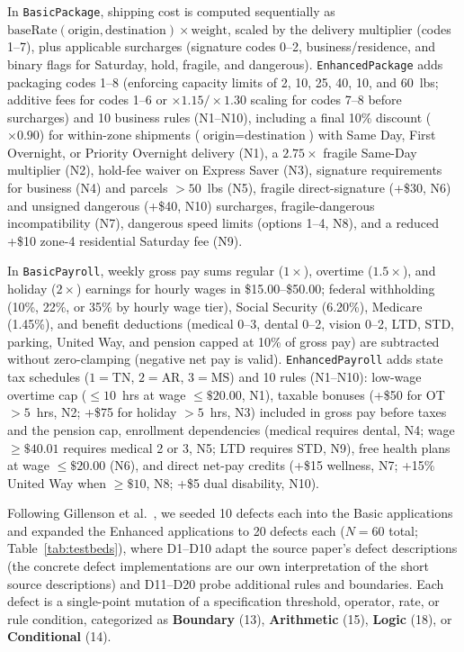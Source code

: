 \documentclass[acmsmall]{acmart}
\begin{document}
In \texttt{BasicPackage}, shipping cost is computed sequentially as $\text{baseRate}(\text{origin}, \text{destination}) \times \text{weight}$, scaled by the delivery multiplier (codes 1--7), plus applicable surcharges (signature codes 0--2, business/residence, and binary flags for Saturday, hold, fragile, and dangerous). \texttt{EnhancedPackage} adds packaging codes 1--8 (enforcing capacity limits of 2, 10, 25, 40, 10, and 60~lbs; additive fees for codes 1--6 or $\times 1.15/\times 1.30$ scaling for codes 7--8 before surcharges) and 10 business rules (N1--N10), including a final 10\% discount ($\times 0.90$) for within-zone shipments ($\text{origin}=\text{destination}$) with Same Day, First Overnight, or Priority Overnight delivery (N1), a $2.75\times$ fragile Same-Day multiplier (N2), hold-fee waiver on Express Saver (N3), signature requirements for business (N4) and parcels $>50$~lbs (N5), fragile direct-signature (+\$30, N6) and unsigned dangerous (+\$40, N10) surcharges, fragile-dangerous incompatibility (N7), dangerous speed limits (options 1--4, N8), and a reduced +\$10 zone-4 residential Saturday fee (N9).

In \texttt{BasicPayroll}, weekly gross pay sums regular ($1\times$), overtime ($1.5\times$), and holiday ($2\times$) earnings for hourly wages in \$15.00--\$50.00; federal withholding (10\%, 22\%, or 35\% by hourly wage tier), Social Security (6.20\%), Medicare (1.45\%), and benefit deductions (medical 0--3, dental 0--2, vision 0--2, LTD, STD, parking, United Way, and pension capped at 10\% of gross pay) are subtracted without zero-clamping (negative net pay is valid). \texttt{EnhancedPayroll} adds state tax schedules ($1=\text{TN}$, $2=\text{AR}$, $3=\text{MS}$) and 10 rules (N1--N10): low-wage overtime cap ($\le 10$~hrs at wage $\le \$20.00$, N1), taxable bonuses (+\$50 for OT $>5$~hrs, N2; +\$75 for holiday $>5$~hrs, N3) included in gross pay before taxes and the pension cap, enrollment dependencies (medical requires dental, N4; wage $\ge \$40.01$ requires medical 2 or 3, N5; LTD requires STD, N9), free health plans at wage $\le \$20.00$ (N6), and direct net-pay credits (+\$15 wellness, N7; +15\% United Way when $\ge \$10$, N8; +\$5 dual disability, N10).

Following Gillenson et al.~\cite{Gillenson2026}, we seeded 10 defects each into the Basic applications and expanded the Enhanced applications to 20 defects each ($N=60$ total; Table~\ref{tab:testbeds}), where D1--D10 adapt the source paper's defect descriptions (the concrete defect implementations are our own interpretation of the short source descriptions) and D11--D20 probe additional rules and boundaries. Each defect is a single-point mutation of a specification threshold, operator, rate, or rule condition, categorized as \textbf{Boundary} (13), \textbf{Arithmetic} (15), \textbf{Logic} (18), or \textbf{Conditional} (14).
\end{document}
